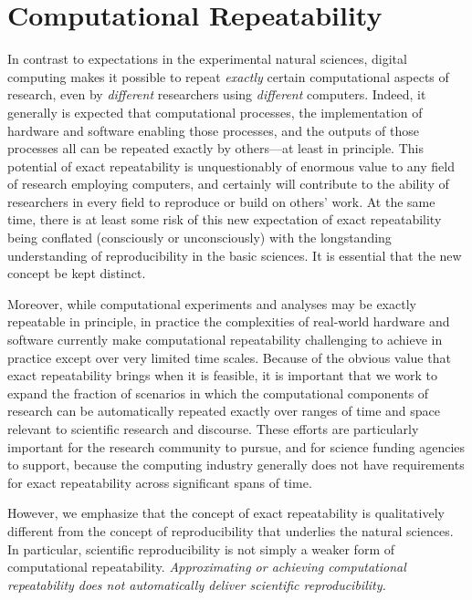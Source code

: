 \section{Computational Repeatability}\label{sec-repeatability}

In contrast to expectations in the experimental natural sciences, digital computing makes it 
	possible to repeat \emph{exactly} certain computational aspects of research, even by \emph{different} 
	researchers using \emph{different} computers.  
Indeed, it generally is expected that computational processes, the implementation of hardware and software 
	enabling those processes, and the outputs of those processes all can be repeated exactly by others---at least in principle.
This potential of exact repeatability is unquestionably of enormous value to any field of research employing computers,
	and certainly will contribute to the ability of researchers in every field to reproduce or build on others' work.
At the same time, there is at least some risk of this new expectation of exact repeatability being conflated 
	(consciously or unconsciously) with the longstanding understanding of reproducibility in the basic sciences. 
It is essential that the new concept be kept distinct.

Moreover, while computational experiments and analyses may be exactly repeatable in principle, 
	in practice the complexities of real-world hardware and software currently make computational repeatability 
	challenging to achieve in practice except over very limited time scales.
Because of the obvious value that exact repeatability brings when it is feasible, it is important that we work to
	expand the fraction of scenarios in which the computational components of research can be automatically 
	repeated exactly over ranges of time and space relevant to scientific research and discourse.
These efforts are particularly important for the research community to pursue, and for science funding
	agencies to support, because the computing industry generally does not have requirements for exact 
	repeatability across significant spans of time.

However, we emphasize that the concept of exact repeatability is 
	qualitatively different from the concept of reproducibility that underlies the natural sciences.
In particular, scientific reproducibility is not simply a weaker form of computational repeatability.  
\emph{Approximating or achieving computational repeatability does not automatically deliver scientific reproducibility.}

